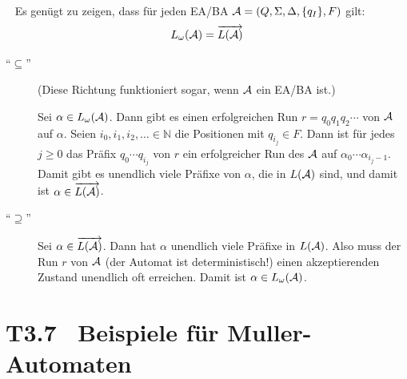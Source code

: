 \documentclass[fontsize=11pt, twoside=false, numbers=autoenddot]{scrbook}
\begin{document}
\par\medskip
{}~
Es genügt zu zeigen, dass
für jeden EA/BA $\mathcal{A}=(Q,\Sigma,\Delta,\{q_I\},F)$ gilt:
\[
  L_\omega(\mathcal{A}) = \overrightarrow{L(\mathcal{A})}
\]
\begin{description}
  \item[{\boldmath"`$\subseteq$"'}]
    (Diese Richtung funktioniert sogar, wenn $\mathcal{A}$ ein EA/BA ist.)
    
    Sei $\alpha \in L_\omega(\mathcal{A})$.
    Dann gibt es einen erfolgreichen Run $r = q_0q_1q_2\cdots$
    von $\mathcal{A}$ auf $\alpha$.
    Seien $i_0,i_1,i_2,\ldots \in \mathbb{N}$ die Positionen mit $q_{i_j} \in F$.
    Dann ist für jedes $j \geq 0$ das Präfix $q_0\cdots q_{i_j}$ von $r$ ein
    erfolgreicher Run des  $\mathcal{A}$ auf $\alpha_0\cdots\alpha_{i_j-1}$.
    Damit gibt es unendlich viele Präfixe von $\alpha$, die in $L(\mathcal{A})$ sind,
    und damit ist $\alpha \in \overrightarrow{L(\mathcal{A})}$.
  \item[{\boldmath"`$\supseteq$"'}]
    Sei $\alpha \in \overrightarrow{L(\mathcal{A})}$.
    Dann hat $\alpha$ unendlich viele Präfixe in $L(\mathcal{A})$.
    Also muss der  Run
    $r$ von $\mathcal{A}$ (der Automat ist deterministisch!)
    einen akzeptierenden Zustand unendlich oft erreichen.
    Damit ist $\alpha \in L_\omega(\mathcal{A})$.
    \qedhere
\end{description}

\section*{T3.7~ Beispiele für Muller-Automaten}
\end{document}
